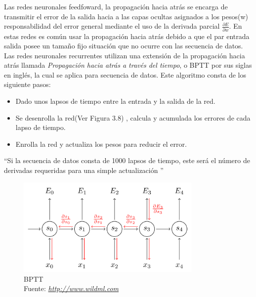 Las redes neuronales feedfoward, la propagación hacia atrás se encarga de transmitir el error de la salida hacia a las capas ocultas asignados a los pesos(w) responsabilidad del error general mediante el uso de la derivada parcial $\frac{ { \partial } E } { \partial w }$. En estas redes es común usar la propagación hacia atrás debido a que el par entrada salida posee un tamaño fijo situación que no ocurre con las secuencia de datos.\\
 Las redes neuronales recurrentes utilizan una extensión de la propagación hacia atrás llamada \textit{Propagación hacia atrás a través del tiempo}, o BPTT  por sus siglas en inglés, la cual se aplica para secuencia de datos.
Este algoritmo consta de los siguiente pasos:
\begin{itemize}
	\item Dado unos lapsos de tiempo entre la entrada y la salida de la red.
	\item Se desenrolla la red(Ver Figura 3.8) , calcula y acumulada los errores de cada lapso de tiempo.
	\item Enrolla la red y actualiza los pesos para reducir el error.
	
\end{itemize}

\textquotedblleft Si la secuencia de datos consta de 1000 lapsos de tiempo, este será el número de derivadas requeridas para una simple actualización \textquotedblright \cite{WEBSITE:20}

\begin{figure}[H]
	\centering
	\includegraphics[width=0.8\textwidth]{Figures/BPTT1.png}
	\caption{BPTT \\ Fuente:  \href{http://www.wildml.com/2015/10/recurrent-neural-networks-tutorial-part-3-backpropagation-through-time-and-vanishing-gradients/}{\textit{http://www.wildml.com}}}
	\label{}
\end{figure}

